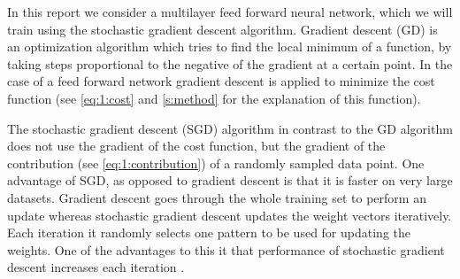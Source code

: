In this report we consider a multilayer feed forward neural network, which we will train using the stochastic gradient descent algorithm. Gradient descent (GD) is an optimization algorithm which tries to find the local minimum of a function, by taking steps proportional to the negative of the gradient at a certain point. In the case of a feed forward network gradient descent is applied to minimize the cost function (see \eqref{eq:1:cost} and \cref{s:method} for the explanation of this function). 

The stochastic gradient descent (SGD) algorithm in contrast to the GD algorithm does not use the gradient of the cost function, but the gradient of the contribution (see \eqref{eq:1:contribution}) of a randomly sampled data point. One advantage of SGD, as opposed to gradient descent is that it is faster on very large datasets. Gradient descent goes through the whole training set to perform an update whereas stochastic gradient descent updates the weight vectors iteratively. Each iteration it randomly selects one pattern to be used for updating the weights. One of the advantages to this it that performance of stochastic gradient descent increases each iteration \cite{bottou2010large}.
